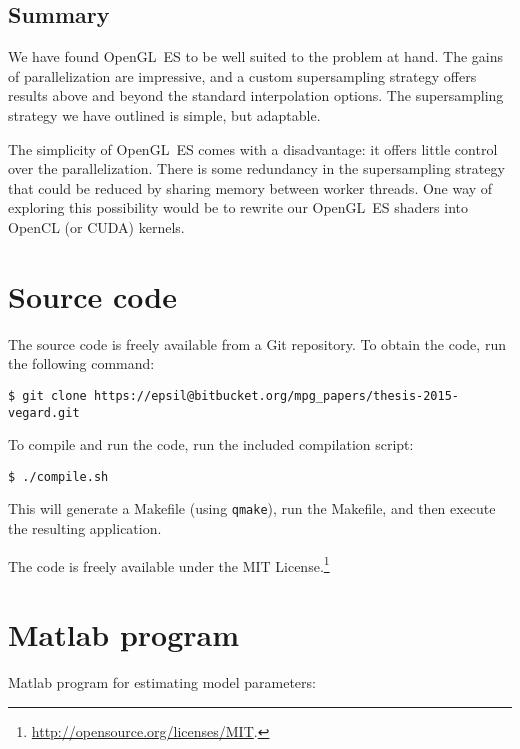 \documentclass[english,12pt]{ifimaster}
\begin{document}
\section*{Summary}

We have found OpenGL~ES to be well suited to the problem at hand. The
gains of parallelization are impressive, and a custom supersampling
strategy offers results above and beyond the standard interpolation
options. The supersampling strategy we have outlined is simple, but
adaptable.

The simplicity of OpenGL~ES comes with a disadvantage: it offers
little control over the parallelization. There is some redundancy in
the supersampling strategy that could be reduced by sharing memory
between worker threads. One way of exploring this possibility would be
to rewrite our OpenGL~ES shaders into OpenCL (or CUDA) kernels.

\appendix

\chapter{Source code}
\label{chap:code}

The source code is freely available from a Git repository. To obtain
the code, run the following command:
{\footnotesize
\begin{verbatim}
$ git clone https://epsil@bitbucket.org/mpg_papers/thesis-2015-vegard.git
\end{verbatim} }
To compile and run the code, run the included compilation script:
{\footnotesize
\begin{verbatim}
$ ./compile.sh
\end{verbatim} }
This will generate a Makefile (using \lstinline|qmake|), run the
Makefile, and then execute the resulting application.


The code is freely available under the MIT
License.\footnote{\url{http://opensource.org/licenses/MIT}.}

\chapter{Matlab program}
\label{chap:matlab}

Matlab program for estimating model parameters:



\backmatter{}





\listoffigures
\listoftables
\lstlistoflistings
\listofalgorithms
\end{document}
